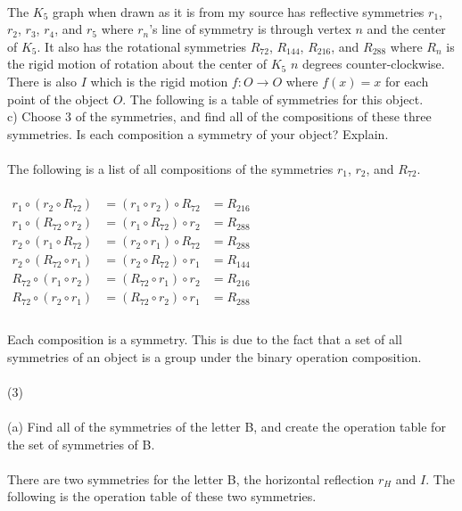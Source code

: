 \documentclass[11pt,a4paper]{article}
\begin{document}
~\\
The $K_5$ graph when drawn as it is from my source has reflective symmetries $r_1$, $r_2$, $r_3$, $r_4$, and $r_5$ where $r_n$'s line of symmetry is through vertex $n$ and the center of $K_5$. It also has the rotational symmetries $R_{72}$, $R_{144}$, $R_{216}$, and $R_{288}$ where $R_n$ is the rigid motion of rotation about the center of $K_5$ $n$ degrees counter-clockwise. There is also $I$ which is the rigid motion $f:O\rightarrow O$ where $f(x)=x$ for each point of the object $O$. The following is a table of symmetries for this object.\\
\newpage
c) Choose 3 of the symmetries, and find all of the compositions of these three symmetries. Is each composition a symmetry of your object? Explain.\\
~\\
The following is a list of all compositions of the symmetries $r_1$, $r_2$, and $R_{72}$.\\
~\\
$
\begin{array}{rll}
r_1\circ (r_2\circ R_{72}) &= (r_1\circ r_2)\circ R_{72} &= R_{216}\\
r_1\circ (R_{72}\circ r_2) &= (r_1\circ R_{72})\circ r_2 &= R_{288}\\
r_2\circ (r_1\circ R_{72}) &=  (r_2\circ r_1)\circ R_{72} &= R_{288}\\
r_2\circ (R_{72}\circ r_1) &= (r_2\circ R_{72})\circ r_1 &= R_{144}\\
R_{72}\circ (r_1\circ r_2) &= (R_{72}\circ r_1)\circ r_2 &= R_{216}\\
R_{72}\circ (r_2\circ r_1) &= (R_{72}\circ r_2)\circ r_1 &= R_{288}\\
\end{array}
$\\
~\\
Each composition is a symmetry. This is due to the fact that a set of all symmetries of an object is a group under the binary operation composition.\\
~\\
(3)\\ 
~\\
(a) Find all of the symmetries of the letter B, and create the operation table
for the set of symmetries of B.\\
~\\
There are two symmetries for the letter B, the horizontal reflection $r_H$ and $I$. The following is the operation table of these two symmetries.\\
\end{document}
